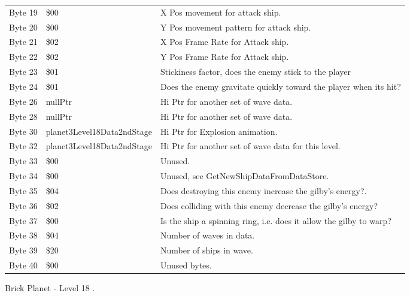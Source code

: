\begin{figure}[H]
{\begin{adjustbox}{width=12cm}
\begin{tabular}{lll}
 Byte 19 & \$00                        & X Pos movement for attack ship.                                    \\
 Byte 20 & \$00                        & Y Pos movement pattern for attack ship.                            \\
 Byte 21 & \$02                        & X Pos Frame Rate for Attack ship.                                  \\
 Byte 22 & \$02                        & Y Pos Frame Rate for Attack ship.                                  \\
 Byte 23 & \$01                        & Stickiness factor, does the enemy stick to the player              \\
 Byte 24 & \$01                        & Does the enemy gravitate quickly toward the player when its hit?   \\
 Byte 26 & nullPtr                    & Hi Ptr for another set of wave data.                               \\
 Byte 28 & nullPtr                    & Hi Ptr for another set of wave data.                               \\
 Byte 30 & planet3Level18Data2ndStage & Hi Ptr for Explosion animation.                                    \\
 Byte 32 & planet3Level18Data2ndStage & Hi Ptr for another set of wave data for this level.                \\
 Byte 33 & \$00                        & Unused.                                                            \\
 Byte 34 & \$00                        & Unused, see GetNewShipDataFromDataStore.                           \\
 Byte 35 & \$04                        & Does destroying this enemy increase the gilby's energy?.           \\
 Byte 36 & \$02                        & Does colliding with this enemy decrease the gilby's energy?        \\
 Byte 37 & \$00                        & Is the ship a spinning ring, i.e. does it allow the gilby to warp? \\
 Byte 38 & \$04                        & Number of waves in data.                                           \\
 Byte 39 & \$20                        & Number of ships in wave.                                           \\
 Byte 40 & \$00                        & Unused bytes.                                                      \\
\bottomrule
\end{tabular}

  \end{adjustbox}

  }\caption*{Brick Planet - Level 18
.}
\end{figure}

